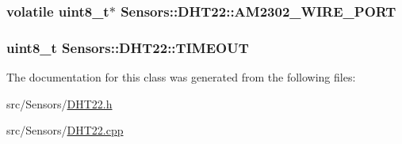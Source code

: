 \subsubsection[{\texorpdfstring{A\+M2302\+\_\+\+W\+I\+R\+E\+\_\+\+P\+O\+RT}{AM2302_WIRE_PORT}}]{\setlength{\rightskip}{0pt plus 5cm}volatile uint8\+\_\+t$\ast$ Sensors\+::\+D\+H\+T22\+::\+A\+M2302\+\_\+\+W\+I\+R\+E\+\_\+\+P\+O\+RT\hspace{0.3cm}{\ttfamily [private]}}\hypertarget{classSensors_1_1DHT22_a715f00b8b520dc18e0297e16209f474f}{}\label{classSensors_1_1DHT22_a715f00b8b520dc18e0297e16209f474f}
\subsubsection[{\texorpdfstring{T\+I\+M\+E\+O\+UT}{TIMEOUT}}]{\setlength{\rightskip}{0pt plus 5cm}uint8\+\_\+t Sensors\+::\+D\+H\+T22\+::\+T\+I\+M\+E\+O\+UT\hspace{0.3cm}{\ttfamily [private]}}\hypertarget{classSensors_1_1DHT22_ad3a2e38a8a6dafe6afd0d7474cc2f42f}{}\label{classSensors_1_1DHT22_ad3a2e38a8a6dafe6afd0d7474cc2f42f}


The documentation for this class was generated from the following files\+:\begin{DoxyCompactItemize}
\item 
src/\+Sensors/\hyperlink{DHT22_8h}{D\+H\+T22.\+h}\item 
src/\+Sensors/\hyperlink{DHT22_8cpp}{D\+H\+T22.\+cpp}\end{DoxyCompactItemize}
